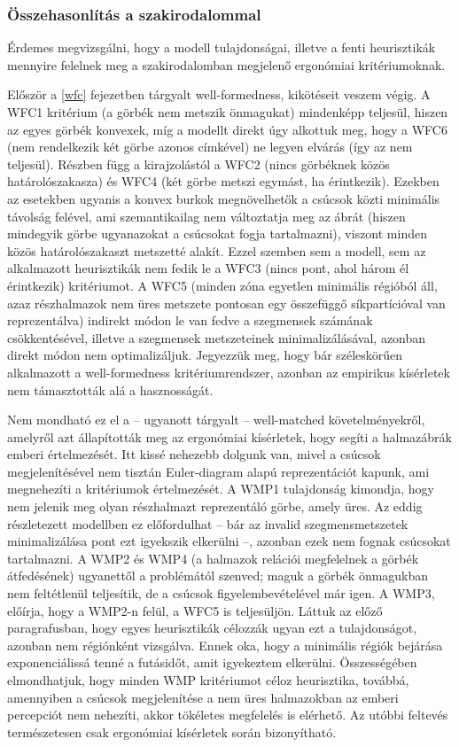 \subsubsection{Összehasonlítás a szakirodalommal}

Érdemes megvizsgálni, hogy a modell tulajdonságai, illetve a fenti heurisztikák mennyire felelnek meg a szakirodalomban megjelenő ergonómiai kritériumoknak.


Először a \ref{wfc} fejezetben tárgyalt well-formedness, kikötéseit veszem végig. A WFC1 kritérium (a görbék nem metszik önmagukat) mindenképp teljesül, hiszen az egyes görbék konvexek, míg a modellt direkt úgy alkottuk meg, hogy a WFC6 (nem rendelkezik két görbe azonos címkével) ne legyen elvárás (így az nem teljesül). Részben függ a kirajzolástól a WFC2 (nincs görbéknek közös határolószakasza) és WFC4 (két görbe metszi egymást, ha érintkezik). Ezekben az esetekben ugyanis a konvex burkok megnövelhetők a csúcsok közti minimális távolság felével, ami szemantikailag nem változtatja meg az ábrát (hiszen mindegyik görbe ugyanazokat a csúcsokat fogja tartalmazni), viszont minden közös határolószakaszt metszetté alakít. Ezzel szemben sem a modell, sem az alkalmazott heurisztikák nem fedik le a WFC3 (nincs pont, ahol három él érintkezik) kritériumot. A WFC5 (minden zóna egyetlen minimális régióból áll, azaz részhalmazok nem üres metszete pontosan egy összefüggő síkpartícióval van reprezentálva) indirekt módon le van fedve a szegmensek számának csökkentésével, illetve a szegmensek metszeteinek minimalizálásával, azonban direkt módon nem optimalizáljuk. Jegyezzük meg, hogy bár széleskörűen alkalmazott a well-formedness kritériumrendszer, azonban az empirikus kísérletek nem támasztották alá a hasznosságát.


Nem mondható ez el a -- ugyanott tárgyalt -- well-matched követelményekről, amelyről azt állapították meg az ergonómiai kísérletek, hogy segíti a halmazábrák emberi értelmezését. Itt kissé nehezebb dolgunk van, mivel a csúcsok megjelenítésével nem tisztán Euler-diagram alapú reprezentációt kapunk, ami megnehezíti a kritériumok értelmezését. A WMP1 tulajdonság kimondja, hogy nem jelenik meg olyan részhalmazt reprezentáló görbe, amely üres. Az eddig részletezett modellben ez előfordulhat -- bár az invalid szegmensmetszetek minimalizálása pont ezt igyekszik elkerülni --, azonban ezek nem fognak csúcsokat tartalmazni. A WMP2 és WMP4 (a halmazok relációi megfelelnek a görbék átfedésének) ugyanettől a problémától szenved; maguk a görbék önmagukban nem feltétlenül teljesítik, de a csúcsok figyelembevételével már igen. A WMP3, előírja, hogy  a WMP2-n felül, a WFC5 is teljesüljön. Láttuk az előző paragrafusban, hogy egyes heurisztikák célozzák ugyan ezt a tulajdonságot, azonban nem régiónként vizsgálva. Ennek oka, hogy a minimális régiók bejárása exponenciálissá tenné a futásidőt, amit igyekeztem elkerülni. Összességében elmondhatjuk, hogy minden WMP kritériumot céloz heurisztika, továbbá, amennyiben a csúcsok megjelenítése a nem üres halmazokban az emberi percepciót nem nehezíti, akkor tökéletes megfelelés is elérhető. Az utóbbi feltevés természetesen csak ergonómiai kísérletek során bizonyítható.


